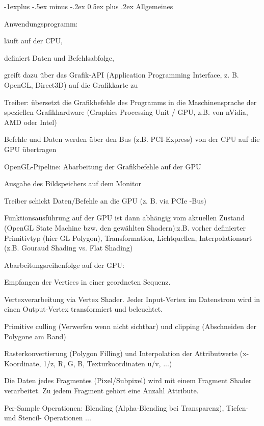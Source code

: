 \documentclass[landscape]{article}
\makeatletter
\renewcommand{\subsection}{\@startsection{subsection}{2}{0mm}%
                                {-1explus -.5ex minus -.2ex}%
                                {0.5ex plus .2ex}%
                                {\normalfont\normalsize\bfseries}}
\makeatother
\begin{document}
\begin{multicols}{3}
  \subsection{Allgemeines}
  \begin{itemize*}
    \item Anwendungsprogramm:
    \begin{itemize*}
      \item läuft auf der CPU,
      \item definiert Daten und Befehlsabfolge,
      \item greift dazu über das Grafik-API (Application Programming Interface, z. B. OpenGL, Direct3D) auf die Grafikkarte zu
    \end{itemize*}
    \item Treiber: übersetzt die Grafikbefehle des Programms in die Maschinensprache der speziellen Grafikhardware (Graphics Processing Unit / GPU, z.B. von nVidia, AMD oder Intel)
    \item Befehle und Daten werden über den Bus (z.B. PCI-Express) von der CPU auf die GPU übertragen
    \item OpenGL-Pipeline: Abarbeitung der Grafikbefehle auf der GPU
    \item Ausgabe des Bildspeichers auf dem Monitor
    \item Treiber schickt Daten/Befehle an die GPU (z. B. via PCIe -Bus)
    \item Funktionsausführung auf der GPU ist dann abhängig vom aktuellen Zustand (OpenGL State Machine bzw. den gewählten Shadern):z.B. vorher definierter Primitivtyp (hier GL Polygon), Transformation, Lichtquellen, Interpolationsart (z.B. Gouraud Shading vs. Flat Shading)
  \end{itemize*}
  
  Abarbeitungsreihenfolge auf der GPU:
  \begin{itemize*}
    \item Empfangen der Vertices in einer geordneten Sequenz.
    \item Vertexverarbeitung via Vertex Shader. Jeder Input-Vertex im Datenstrom wird in einen Output-Vertex transformiert und beleuchtet.
    \item Primitive culling (Verwerfen wenn nicht sichtbar) und clipping (Abschneiden der Polygone am Rand)
    \item Rasterkonvertierung (Polygon Filling) und Interpolation der Attributwerte (x-Koordinate, 1/z, R, G, B, Texturkoordinaten u/v, ...)
    \item Die Daten jedes Fragmentes (Pixel/Subpixel) wird mit einem Fragment Shader verarbeitet. Zu jedem Fragment gehört eine Anzahl Attribute.
    \item Per-Sample Operationen: Blending (Alpha-Blending bei Transparenz), Tiefen- und Stencil- Operationen ...
  \end{itemize*}
  

\end{multicols}
\end{document}
